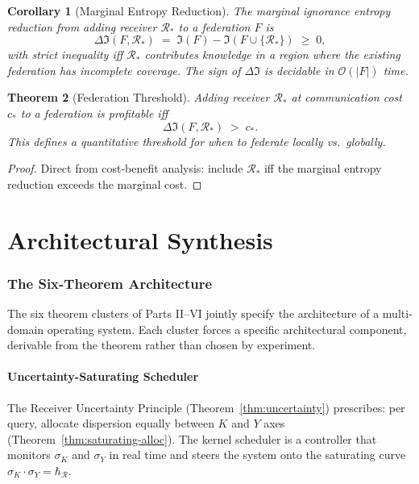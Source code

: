 \documentclass[11pt,a4paper]{article}
\newtheorem{theorem}{Theorem}[section]
\newtheorem{corollary}[theorem]{Corollary}
\newcommand{\receiver}{\mathcal{R}}
\newcommand{\hbarR}{\hbar_{\receiver}}
\newcommand{\disp}{\sigma}
\begin{document}
\begin{corollary}[Marginal Entropy Reduction]
\label{cor:marginal-entropy}
The marginal ignorance entropy reduction from adding receiver $\receiver_*$ to a federation $F$ is
\[
\Delta \mathfrak{I}(F, \receiver_*) \;=\; \mathfrak{I}(F) - \mathfrak{I}(F \cup \{\receiver_*\}) \;\geq\; 0,
\]
with strict inequality iff $\receiver_*$ contributes knowledge in a region where the existing federation has incomplete coverage. The sign of $\Delta \mathfrak{I}$ is decidable in $\mathcal{O}(|F|)$ time.
\end{corollary}

\begin{theorem}[Federation Threshold]
\label{thm:federation-threshold}
Adding receiver $\receiver_*$ at communication cost $c_*$ to a federation is profitable iff
\[
\Delta \mathfrak{I}(F, \receiver_*) \;>\; c_*.
\]
This defines a quantitative threshold for when to federate locally vs.\ globally.
\end{theorem}

\begin{proof}
Direct from cost-benefit analysis: include $\receiver_*$ iff the marginal entropy reduction exceeds the marginal cost.
\end{proof}

\part{Architectural Synthesis}

\section{The Six-Theorem Architecture}
\label{sec:architecture}

The six theorem clusters of Parts II--VI jointly specify the architecture of a multi-domain operating system. Each cluster forces a specific architectural component, derivable from the theorem rather than chosen by experiment.

\subsection{Uncertainty-Saturating Scheduler}

The Receiver Uncertainty Principle (Theorem~\ref{thm:uncertainty}) prescribes: per query, allocate dispersion equally between $K$ and $Y$ axes (Theorem~\ref{thm:saturating-alloc}). The kernel scheduler is a controller that monitors $\disp_K$ and $\disp_Y$ in real time and steers the system onto the saturating curve $\disp_K \cdot \disp_Y = \hbarR$.
\end{document}
